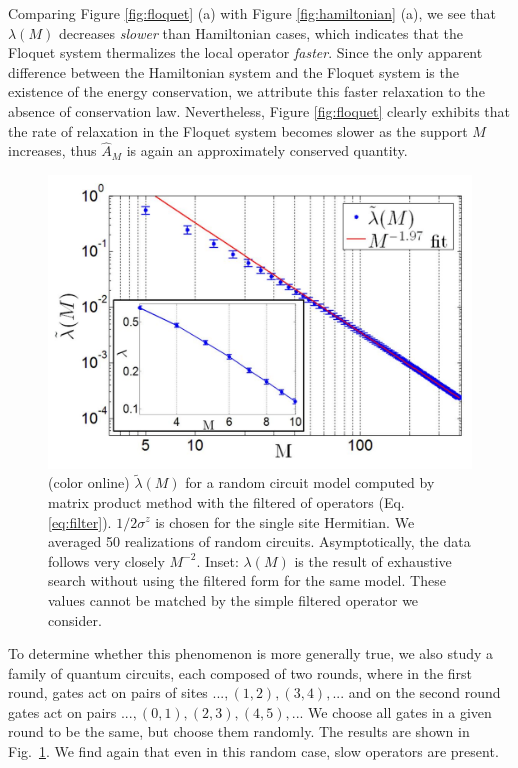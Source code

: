 \documentclass[twocolumn,superscriptaddress, prl,showpacs]{revtex4-1}
\begin{document}
Comparing Figure \ref{fig:floquet} (a) with Figure \ref{fig:hamiltonian} (a),
we see that $\lambda(M)$ decreases {\it slower} than Hamiltonian cases, which indicates that the Floquet system thermalizes
the local operator {\it faster}. Since the only apparent difference between the Hamiltonian system and the Floquet system
is the existence of the energy conservation, we attribute this faster relaxation to the absence of conservation law.
Nevertheless, Figure \ref{fig:floquet} clearly exhibits that the rate of relaxation in the Floquet system
becomes slower as the support $M$ increases, thus $\hat{A}_M$ is again an approximately conserved quantity.


\begin{figure}
\includegraphics[width=0.95\linewidth]{fig_random_circuit.pdf}
\centering
\caption{ (color online)  $\tilde{\lambda}(M)$ for a random circuit model computed by matrix product method with the filtered of operators (Eq. \eqref{eq:filter}). $1/2\sigma^z$ is chosen for the single site Hermitian. We averaged 50 realizations of random circuits. Asymptotically, the data follows very closely $M^{-2}$.
Inset: $\lambda(M)$ is the result of exhaustive search without using the filtered form for the same model.
These values cannot be matched by the simple filtered operator we consider.}
\label{fig:random_circuit}
\end{figure}



To determine whether this phenomenon is more generally true, we also study a family of quantum circuits, each composed of two rounds, where in the first round, gates act on pairs of sites $...,(1,2),(3,4),...$ and on the second round gates act on pairs $...,(0,1),(2,3),(4,5),...$
We choose all gates in a given round to be the same, but choose them randomly.
The results are shown in Fig.~\ref{fig:random_circuit}.
We find again that even in this random case, slow operators are present.
\end{document}
